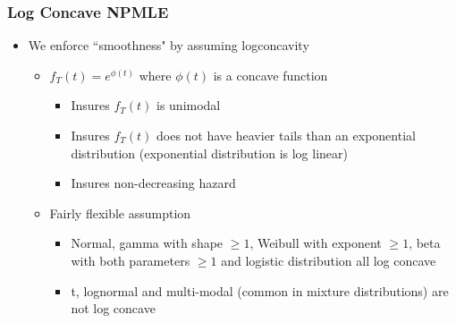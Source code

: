 \documentclass[compress,red]{beamer}
\begin{document}
\begin{frame}

\frametitle{Log Concave NPMLE}

	\begin{itemize}
	
	\item We enforce ``smoothness" by assuming logconcavity 
	
		\begin{itemize}
		
		\item $f_T(t) = e^{\phi(t)}$ where $\phi(t)$ is a concave function
		
			\begin{itemize}
			
			\item Insures $f_T(t)$ is unimodal
			
			\item Insures $f_T(t)$ does not have heavier tails than an exponential distribution (exponential distribution is log linear)
			
			\item Insures non-decreasing hazard
			
			\end{itemize}
		
		\item Fairly flexible assumption
		
			\begin{itemize}
			
			\item Normal, gamma with shape $\geq 1$, Weibull with exponent $\geq 1$, beta with both parameters $\geq 1$ and logistic distribution all log concave
			
			\item t, lognormal and multi-modal (common in mixture distributions) are not log concave
			
			\end{itemize}
		
		\end{itemize}
	
	\end{itemize}

\end{frame}
\end{document}
